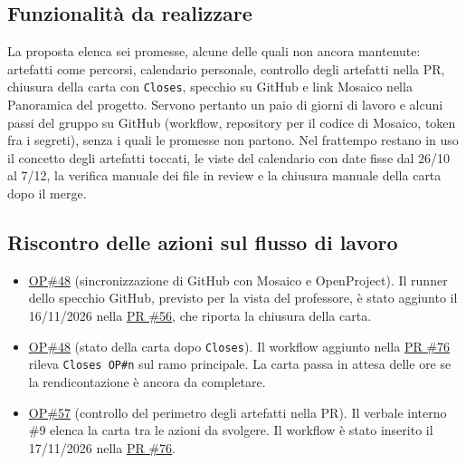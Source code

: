 \documentclass[a4paper, 11pt]{article}
\begin{document}
\subsection{Funzionalit\`a da realizzare}

La proposta elenca sei promesse, alcune delle quali non ancora mantenute: artefatti come percorsi, calendario personale, controllo degli artefatti nella PR, chiusura della carta con \texttt{Closes}, specchio su GitHub e link Mosaico nella Panoramica del progetto. \newline Servono pertanto un paio di giorni di lavoro e alcuni passi del gruppo su GitHub (workflow, repository per il codice di Mosaico, token fra i segreti), senza i quali le promesse non partono.
\newline \newline
Nel frattempo restano in uso il concetto degli artefatti toccati, le viste del calendario con date fisse dal 26/10 al 7/12, la verifica manuale dei file in review e la chiusura manuale della carta dopo il merge.

\subsection{Riscontro delle azioni sul flusso di lavoro}
\begin{itemize}
    \item \href{https://openproject.tail1be59a.ts.net/work_packages/48}{OP\#48} (sincronizzazione di GitHub con Mosaico e OpenProject). Il runner dello specchio GitHub, previsto per la vista del professore, è stato aggiunto il 16/11/2026 nella \href{https://github.com/BitCrusher-Team/Progetto_SWE_26-27/pull/56}{PR \#56}, che riporta la chiusura della carta.
    \item \href{https://openproject.tail1be59a.ts.net/work_packages/48}{OP\#48} (stato della carta dopo \texttt{Closes}). Il workflow aggiunto nella \href{https://github.com/BitCrusher-Team/Progetto_SWE_26-27/pull/76}{PR \#76} rileva \texttt{Closes OP\#n} sul ramo principale. La carta passa in attesa delle ore se la rendicontazione è ancora da completare.
    \item \href{https://openproject.tail1be59a.ts.net/work_packages/57}{OP\#57} (controllo del perimetro degli artefatti nella PR). Il verbale interno \#9 elenca la carta tra le azioni da svolgere. Il workflow è stato inserito il 17/11/2026 nella \href{https://github.com/BitCrusher-Team/Progetto_SWE_26-27/pull/76}{PR \#76}.
\end{itemize}
\end{document}
